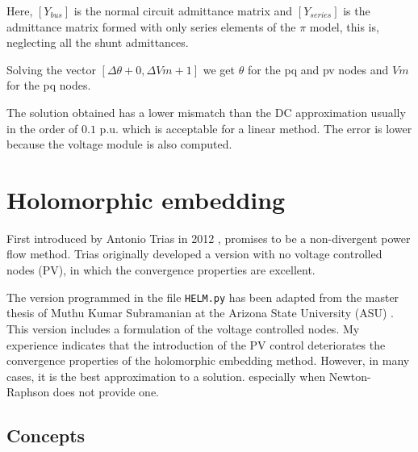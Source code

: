 \documentclass[nols,a4paper,twoside,notoc,fleqn]{tufte-book}
\begin{document}
Here, $[Y_{bus}]$ is the normal circuit admittance matrix and $[Y_{series}]$ is the admittance matrix formed with only series elements of the $\pi$ model, this is, neglecting all the shunt admittances.

Solving the vector $[\Delta \theta + 0, \Delta Vm + 1]$ we get $\theta$ for the pq and pv nodes and $Vm$ for the pq nodes.\newline

%

The solution obtained has a lower mismatch than the DC approximation usually in the order of $0.1$ p.u. which is acceptable for a linear method. The error is lower because the voltage module is also computed.

\section{Holomorphic embedding}

First introduced by Antonio Trias in 2012 \cite{TriasHELM}, promises to be a non-divergent power flow method. Trias originally developed a version with no voltage controlled nodes (PV), in which the convergence properties are excellent. 

The version programmed in the file \verb|HELM.py| has been adapted from the master thesis of Muthu Kumar Subramanian at the Arizona State University (ASU) \cite{subramanian2014application}. This version includes a formulation of the voltage controlled nodes. My experience indicates that the introduction of the PV control deteriorates the convergence properties of the holomorphic embedding method. However, in many cases, it is the best approximation to a solution. especially when Newton-Raphson does not provide one.


\subsection{Concepts}
\end{document}
